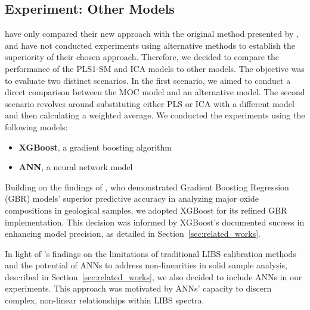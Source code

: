 \subsection{Experiment: Other Models}\label{sec:experiment_other_models}
\citet{cleggRecalibrationMarsScience2017} have only compared their new approach with the original method presented by \citet{wiensPreFlight3}, and have not conducted experiments using alternative methods to establish the superiority of their chosen approach.
Therefore, we decided to compare the performance of the PLS1-SM and ICA models to other models.
The objective was to evaluate two distinct scenarios.
In the first scenario, we aimed to conduct a direct comparison between the MOC model and an alternative model. The second scenario revolves around substituting either PLS or ICA with a different model and then calculating a weighted average.
We conducted the experiments using the following models:

\begin{itemize}
	\item \textbf{XGBoost}, a gradient boosting algorithm \cite{chen_xgboost_2016}
	\item \textbf{ANN}, a neural network model
\end{itemize}

Building on the findings of \citet{andersonPostlandingMajorElement2022}, who demonstrated Gradient Boosting Regression (GBR) models' superior predictive accuracy in analyzing major oxide compositions in geological samples, we adopted XGBoost for its refined GBR implementation.
This decision was informed by XGBoost's documented success in enhancing model precision, as detailed in Section~\ref{sec:related_works}.

In light of \citeauthor{takahashi_quantitative_2017}'s findings on the limitations of traditional LIBS calibration methods and the potential of ANNs to address non-linearities in solid sample analysis, described in Section~\ref{sec:related_works}, we also decided to include ANNs in our experiments.
This approach was motivated by ANNs' capacity to discern complex, non-linear relationships within LIBS spectra.


